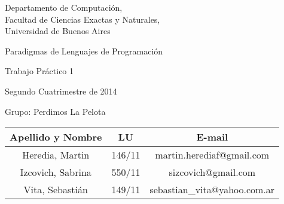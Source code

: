 \documentclass[10pt, a4paper]{article}
\author{Algoritmos y Estructuras de Datos III, DC, UBA.}
\date{}
\begin{document}
	
\thispagestyle{caratula}

\begin{center}

\vspace{2cm}

Departamento de Computación,\\
Facultad de Ciencias Exactas y Naturales,\\
Universidad de Buenos Aires

\vspace{4cm}

\begin{Huge}
Paradigmas de Lenguajes de Programación
\end{Huge}

\vspace{0.5cm}

\begin{huge}
Trabajo Práctico 1
\end{huge}

\vspace{1cm}

Segundo Cuatrimestre de 2014

\vspace{4cm}


\begin{Large}
Grupo: Perdimos La Pelota
\end{Large}

\vspace{1cm}

\begin{tabular}{|c|c|c|}
\hline
Apellido y Nombre & LU & E-mail\\
\hline
Heredia, Martin        & 146/11 & martin.herediaf@gmail.com\\
Izcovich, Sabrina      & 550/11 & sizcovich@gmail.com\\
Vita, Sebastián        & 149/11 & sebastian\_vita@yahoo.com.ar\\
\hline
\end{tabular}

\end{center}

\newpage
\end{document}
